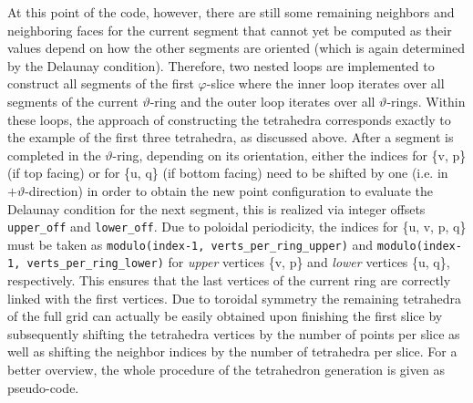 \documentclass[./main.tex]{subfiles}
\begin{document}
At this point of the code, however, there are still some remaining neighbors and neighboring faces for the current segment that cannot yet be computed as their values depend on how the other segments are oriented (which is again determined by the Delaunay condition). Therefore, two nested loops are implemented to construct all segments of the first $\varphi$-slice where the inner loop iterates over all segments of the current $\vartheta$-ring and the outer loop iterates over all $\vartheta$-rings. Within these loops, the approach of constructing the tetrahedra corresponds exactly to the example of the first three tetrahedra, as discussed above. After a segment is completed in the $\vartheta$-ring, depending on its orientation, either the indices for \{v, p\} (if top facing) or for \{u, q\} (if bottom facing) need to be shifted by one (i.e. in $+\vartheta$-direction) in order to obtain the new point configuration to evaluate the Delaunay condition for the next segment, this is realized via integer offsets \texttt{upper\_off} and \texttt{lower\_off}. Due to poloidal periodicity, the indices for \{u, v, p, q\} must be taken as \texttt{modulo(index-1, verts\_per\_ring\_upper)} and \texttt{modulo(index-1, verts\_per\_ring\_lower)} for \textit{upper} vertices \{v, p\} and \textit{lower} vertices \{u, q\}, respectively. This ensures that the last vertices of the current ring are correctly linked with the first vertices. Due to toroidal symmetry the remaining tetrahedra of the full grid can actually be easily obtained upon finishing the first slice by subsequently shifting the tetrahedra vertices by the number of points per slice as well as shifting the neighbor indices by the number of tetrahedra per slice. 
For a better overview, the whole procedure of the tetrahedron generation is given as pseudo-code.
\end{document}
